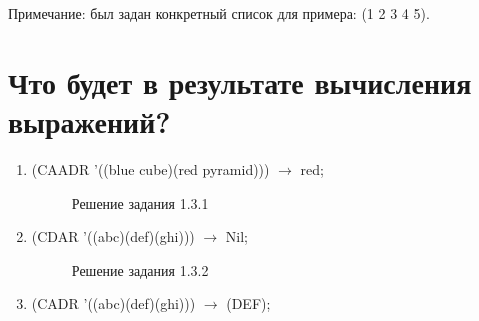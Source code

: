 \documentclass[12pt]{report}
\begin{document}
Примечание: был задан конкретный список для примера: (1 2 3 4 5).

\section{Что будет в результате вычисления выражений?}

\begin{enumerate}
	\item (CAADR '((blue cube)(red pyramid))) $\to$ red;
	\begin{figure}[!h]
		\caption{Решение задания 1.3.1}
	\end{figure}
	\item (CDAR '((abc)(def)(ghi))) $\to$ Nil;
	\begin{figure}[!h]
		\caption{Решение задания 1.3.2}
	\end{figure}
	\item (CADR '((abc)(def)(ghi))) $\to$ (DEF);
	\begin{figure}[!h]

\end{figure}
\end{enumerate}
\end{document}
